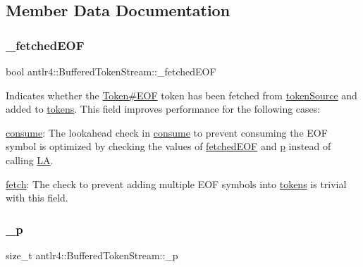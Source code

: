 \subsection{Member Data Documentation}
\mbox{\label{classantlr4_1_1BufferedTokenStream_a400797b54a3d7d151aa0ace27e766e8e}} 
\subsubsection{\texorpdfstring{\+\_\+fetched\+E\+OF}{\_fetchedEOF}}
{\footnotesize\ttfamily bool antlr4\+::\+Buffered\+Token\+Stream\+::\+\_\+fetched\+E\+OF\hspace{0.3cm}{\ttfamily [protected]}}

Indicates whether the \hyperlink{}{Token\#\+E\+OF} token has been fetched from \hyperlink{}{token\+Source} and added to \hyperlink{}{tokens}. This field improves performance for the following cases\+:


\begin{DoxyItemize}
\item \hyperlink{}{consume}\+: The lookahead check in \hyperlink{}{consume} to prevent consuming the E\+OF symbol is optimized by checking the values of \hyperlink{}{fetched\+E\+OF} and \hyperlink{}{p} instead of calling \hyperlink{}{LA}. 
\item \hyperlink{}{fetch}\+: The check to prevent adding multiple E\+OF symbols into \hyperlink{}{tokens} is trivial with this field. 
\begin{DoxyItemize}
\item 
\end{DoxyItemize}
\end{DoxyItemize}\mbox{\label{classantlr4_1_1BufferedTokenStream_aa8ab272f9ef3f5195ef8aeb4da15f9ca}} 
\subsubsection{\texorpdfstring{\+\_\+p}{\_p}}
{\footnotesize\ttfamily size\+\_\+t antlr4\+::\+Buffered\+Token\+Stream\+::\+\_\+p\hspace{0.3cm}{\ttfamily [protected]}}

